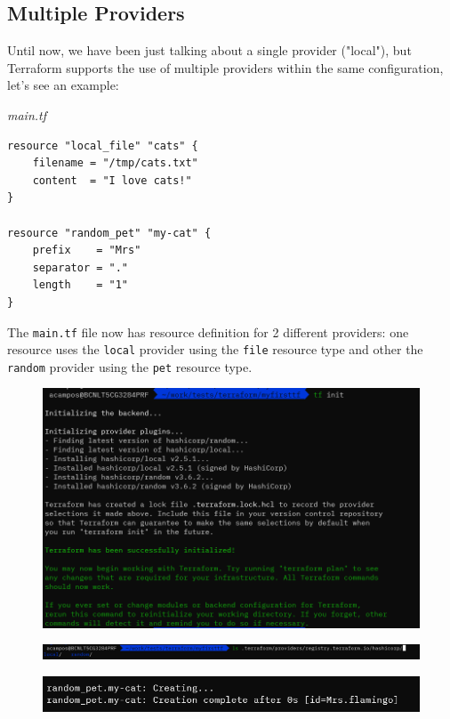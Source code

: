 \documentclass{article}
\newenvironment{codetemplate}[1][]{%
  \mybasecolorbox[#1]
  \itshape
}{%
  \endmybasecolorbox
}
\begin{document}
\subsection{Multiple Providers}
Until now, we have been just talking about a single provider ("local"), but Terraform supports the use of multiple providers within the same configuration, let's see an example:

\begin{codetemplate}{main.tf}
\begin{verbatim}
resource "local_file" "cats" {
    filename = "/tmp/cats.txt"
    content  = "I love cats!"
}

resource "random_pet" "my-cat" {
    prefix    = "Mrs"
    separator = "."
    length    = "1"    
}
\end{verbatim}
\end{codetemplate}

The \verb+main.tf+ file now has resource definition for 2 different providers: one resource uses the \verb+local+ provider using the \verb+file+ resource type and other the \verb+random+ provider using the \verb+pet+ resource type.

\begin{figure}[H]
    \includegraphics[width=\textwidth]{pictures/pic4.png}
    \centering
\end{figure}
\begin{figure}[H]
    \includegraphics[width=\textwidth]{pictures/pic3.png}
    \centering
\end{figure}
\begin{figure}[H]
    \includegraphics[width=\textwidth]{pictures/pic5.png}
    \centering
\end{figure}
\end{document}

